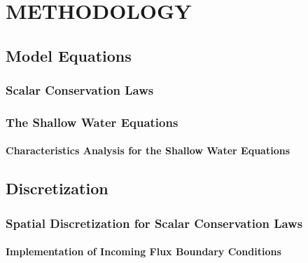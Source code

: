 \chapter{METHODOLOGY}


\section{Model Equations}\label{sec:model_equations}
%  
\subsection{Scalar Conservation Laws\label{sec:scalar}}
  
\subsection{The Shallow Water Equations\label{sec:shallowwater}}
  
  \subsubsection{Characteristics Analysis for the Shallow Water Equations
    \label{sec:shallowwater_characteristics}}
    
\section{Discretization}\label{sec:discretization}
\subsection{Spatial Discretization for Scalar Conservation Laws
  \label{sec:spatial_discretization_scalar}}
  
  \subsubsection{Implementation of Incoming Flux Boundary Conditions
    \label{sec:transport_bc}}
    
